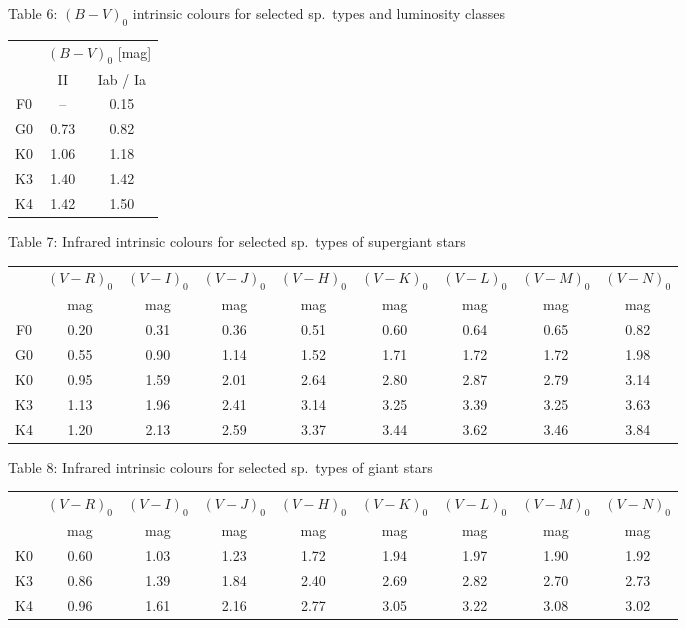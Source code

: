 \medskip
\noindent Table 6: $(B-V)_0$ intrinsic colours for selected sp.\ types and
luminosity classes

\begin{center}
\begin{tabular}{ccc}
\hline
 & \multicolumn{2}{c}{$(B-V)_0$ [mag]} \\
 & II & Iab / Ia \\
\hline
F0 & -- & 0.15 \\
G0 & 0.73 & 0.82 \\
K0 & 1.06 & 1.18 \\
K3 & 1.40 & 1.42 \\
K4 & 1.42 & 1.50 \\
\hline
\end{tabular}
\end{center}

\medskip
\noindent Table 7: Infrared intrinsic colours for selected sp.\ types of
supergiant stars

\begin{center}
\begin{tabular}{ccccccccc}
\hline
 & $(V-R)_0$ & $(V-I)_0$ & $(V-J)_0$ & $(V-H)_0$ & $(V-K)_0$ & $(V-L)_0$ &
   $(V-M)_0$ & $(V-N)_0$ \\
 & mag & mag & mag & mag & mag & mag & mag & mag \\
\hline
F0 & 0.20 & 0.31 & 0.36 & 0.51 & 0.60 & 0.64 & 0.65 & 0.82 \\
G0 & 0.55 & 0.90 & 1.14 & 1.52 & 1.71 & 1.72 & 1.72 & 1.98 \\
K0 & 0.95 & 1.59 & 2.01 & 2.64 & 2.80 & 2.87 & 2.79 & 3.14 \\
K3 & 1.13 & 1.96 & 2.41 & 3.14 & 3.25 & 3.39 & 3.25 & 3.63 \\
K4 & 1.20 & 2.13 & 2.59 & 3.37 & 3.44 & 3.62 & 3.46 & 3.84 \\
\hline
\end{tabular}
\end{center}

\medskip
\noindent Table 8: Infrared intrinsic colours for selected sp.\ types of
giant stars

\begin{center}
\begin{tabular}{ccccccccc}
\hline
 & $(V-R)_0$ & $(V-I)_0$ & $(V-J)_0$ & $(V-H)_0$ & $(V-K)_0$ & $(V-L)_0$ &
   $(V-M)_0$ & $(V-N)_0$ \\
 & mag & mag & mag & mag & mag & mag & mag & mag \\
\hline
K0 & 0.60 & 1.03 & 1.23 & 1.72 & 1.94 & 1.97 & 1.90 & 1.92 \\
K3 & 0.86 & 1.39 & 1.84 & 2.40 & 2.69 & 2.82 & 2.70 & 2.73 \\
K4 & 0.96 & 1.61 & 2.16 & 2.77 & 3.05 & 3.22 & 3.08 & 3.02 \\
\hline
\end{tabular}
\end{center}

